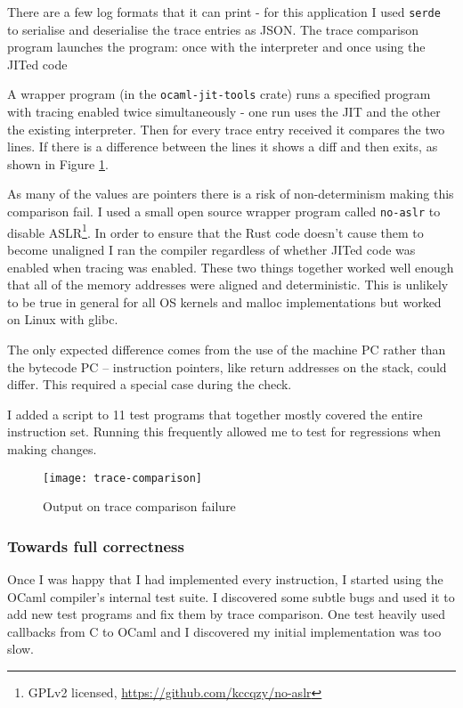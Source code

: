 There are a few log formats that it can print - for this application I used \texttt{serde} to
serialise and deserialise the trace entries as JSON. The trace comparison program launches the
program: once with the interpreter and once using the JITed code

A wrapper program (in the \texttt{ocaml-jit-tools} crate) runs a specified program with
tracing enabled twice simultaneously - one run uses the JIT and the other the
existing interpreter.  Then for every trace entry received it compares the two lines. If there is a
difference between the lines it shows a diff and then exits, as shown in Figure
\ref{fig:trace-comparison}.

As many of the values are pointers there is a risk of non-determinism making this comparison fail.
I used a small open source wrapper program called \texttt{no-aslr} to disable ASLR\footnote{GPLv2
      licensed, \url{https://github.com/kccqzy/no-aslr}}. In order to ensure
that the Rust code doesn't cause them to become unaligned I ran the compiler regardless of whether
JITed code was enabled when tracing was enabled. These two things together worked well enough that
all of the memory addresses were aligned and deterministic. This is unlikely to be true in general
for all OS kernels and malloc implementations but worked on Linux with glibc.

The only expected difference comes from the use of the machine PC rather than the bytecode PC --
instruction pointers, like return addresses on the stack, could differ. This required a special
case during the check.

I added a script to 11 test programs that together mostly covered the entire instruction
set. Running this frequently allowed me to test for regressions when making changes.

\begin{figure}[h]
      \texttt{[image: trace-comparison]}
      \caption{Output on trace comparison failure}
      \label{fig:trace-comparison}
\end{figure}

\subsubsection{Towards full correctness}

Once I was happy that I had implemented every instruction, I started using
the OCaml compiler's internal test suite. I discovered some subtle bugs and used it to add new test
programs and fix them by trace comparison. One test heavily used callbacks from C to OCaml and I
discovered my initial implementation was too slow.

